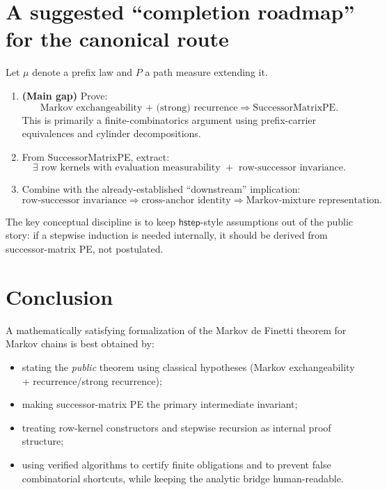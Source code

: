 \documentclass[11pt]{article}
\begin{document}
\section{A suggested ``completion roadmap'' for the canonical route}

Let \(\mu\) denote a prefix law and \(P\) a path measure extending it.

\begin{enumerate}[leftmargin=2em]
\item \textbf{(Main gap)} Prove:
\[
\text{Markov exchangeability + (strong) recurrence} \Rightarrow \text{SuccessorMatrixPE}.
\]
This is primarily a finite-combinatorics argument using prefix-carrier equivalences and cylinder decompositions.
\item From SuccessorMatrixPE, extract:
\[
\exists \text{ row kernels with evaluation measurability } + \text{ row-successor invariance}.
\]
\item Combine with the already-established ``downstream'' implication:
\[
\text{row-successor invariance} \Rightarrow \text{cross-anchor identity} \Rightarrow \text{Markov-mixture representation}.
\]
\end{enumerate}

The key conceptual discipline is to keep \(\mathsf{hstep}\)-style assumptions out of the public story:
if a stepwise induction is needed internally, it should be derived from successor-matrix PE, not postulated.

\section{Conclusion}

A mathematically satisfying formalization of the Markov de Finetti theorem for Markov chains is best obtained by:
\begin{itemize}[leftmargin=2em]
\item stating the \emph{public} theorem using classical hypotheses (Markov exchangeability + recurrence/strong recurrence);
\item making successor-matrix PE the primary intermediate invariant;
\item treating row-kernel constructors and stepwise recursion as internal proof structure;
\item using verified algorithms to certify finite obligations and to prevent false combinatorial shortcuts, while keeping the analytic bridge human-readable.
\end{itemize}
\end{document}
